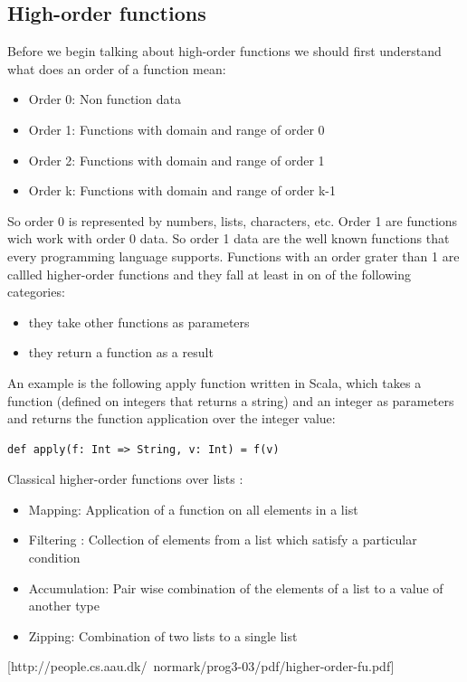 \documentclass{article}
\begin{document}
\subsection {High-order functions}
Before we begin talking about high-order functions we should first understand what does an order of a function mean:

\begin{itemize}
\item Order 0: Non function data
\item Order 1: Functions with domain and range of order 0
\item Order 2: Functions with domain and range of order 1
\item Order k: Functions with domain and range of order k-1
\end{itemize}

So order 0 is represented by numbers, lists, characters, etc. Order 1 are functions wich work with order 0 data. So order 1 data are the well known functions that every programming language supports. 
Functions with an order grater than 1 are callled higher-order functions and they fall at least in on of the following categories:

\begin{itemize}
\item they take other functions as parameters
\item they return a function as a result
\end{itemize}

An example is the following apply function written in Scala, which takes a function (defined on integers that returns a string) and an integer as parameters and returns the function application over the integer value: \par

\begin{lstlisting} 
def apply(f: Int => String, v: Int) = f(v)
\end{lstlisting} 


Classical higher-order functions over lists :

\begin{itemize}
\item Mapping: Application of a function on all elements in a list
\item Filtering : Collection of elements from a list which satisfy a particular condition
\item Accumulation: Pair wise combination of the elements of a list to a value of
another type
\item Zipping: Combination of two lists to a single list
\end{itemize}
[http://people.cs.aau.dk/~normark/prog3-03/pdf/higher-order-fu.pdf]
\end{document}
